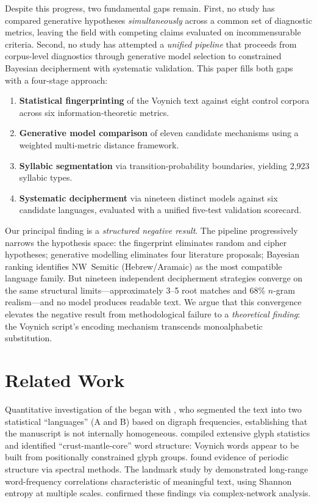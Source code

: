 Despite this progress, two fundamental gaps remain.  First, no study has compared generative hypotheses \emph{simultaneously} across a common set of diagnostic metrics, leaving the field with competing claims evaluated on incommensurable criteria.  Second, no study has attempted a \emph{unified pipeline} that proceeds from corpus-level diagnostics through generative model selection to constrained Bayesian decipherment with systematic validation.  This paper fills both gaps with a four-stage approach:

\begin{enumerate}[nosep]
  \item \textbf{Statistical fingerprinting} of the Voynich text against eight control corpora across six information-theoretic metrics.
  \item \textbf{Generative model comparison} of eleven candidate mechanisms using a weighted multi-metric distance framework.
  \item \textbf{Syllabic segmentation} via transition-probability boundaries, yielding 2,923 syllabic types.
  \item \textbf{Systematic decipherment} via nineteen distinct models against six candidate languages, evaluated with a unified five-test validation scorecard.
\end{enumerate}

Our principal finding is a \emph{structured negative result}.  The pipeline progressively narrows the hypothesis space: the fingerprint eliminates random and cipher hypotheses; generative modelling eliminates four literature proposals; Bayesian ranking identifies NW~Semitic (Hebrew/Aramaic) as the most compatible language family.  But nineteen independent decipherment strategies converge on the same structural limits---approximately 3--5 root matches and 68\% $n$-gram realism---and no model produces readable text.  We argue that this convergence elevates the negative result from methodological failure to a \emph{theoretical finding}: the Voynich script's encoding mechanism transcends monoalphabetic substitution.


\section{Related Work}
\label{sec:related}

Quantitative investigation of the \vms{} began with \citet{currier1976}, who segmented the text into two statistical ``languages'' (A and B) based on digraph frequencies, establishing that the manuscript is not internally homogeneous.  \citet{stolfi1997} compiled extensive glyph statistics and identified ``crust-mantle-core'' word structure: Voynich words appear to be built from positionally constrained glyph groups.  \citet{landini2001} found evidence of periodic structure via spectral methods.  The landmark study by \citet{montemurro2013} demonstrated long-range word-frequency correlations characteristic of meaningful text, using Shannon entropy at multiple scales.  \citet{amancio2013} confirmed these findings via complex-network analysis.


